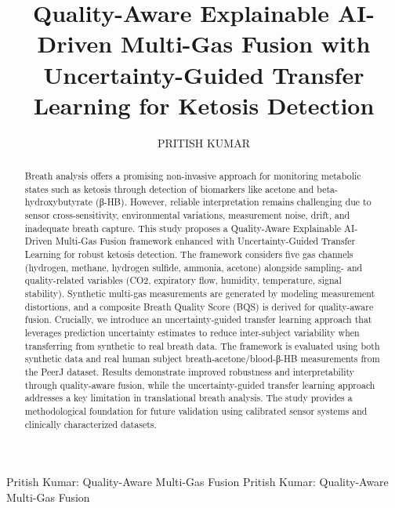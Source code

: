 \documentclass{ieeeaccess}
\begin{document}


\title{
Quality-Aware Explainable AI-Driven Multi-Gas Fusion with
Uncertainty-Guided Transfer Learning for Ketosis Detection
}

\author{
\uppercase{Pritish Kumar}
}

\address[1]{
Department of Electronics and Computer Engineering,
Thapar Institute of Engineering and Technology,
Patiala, Punjab, India
}

\markboth
{Pritish Kumar: Quality-Aware Multi-Gas Fusion}
{Pritish Kumar: Quality-Aware Multi-Gas Fusion}



\begin{abstract}

Breath analysis offers a promising non-invasive approach for monitoring metabolic states such as ketosis through detection of biomarkers like acetone and beta-hydroxybutyrate (β-HB). However, reliable interpretation remains challenging due to sensor cross-sensitivity, environmental variations, measurement noise, drift, and inadequate breath capture. This study proposes a Quality-Aware Explainable AI-Driven Multi-Gas Fusion framework enhanced with Uncertainty-Guided Transfer Learning for robust ketosis detection. The framework considers five gas channels (hydrogen, methane, hydrogen sulfide, ammonia, acetone) alongside sampling- and quality-related variables (CO2, expiratory flow, humidity, temperature, signal stability). Synthetic multi-gas measurements are generated by modeling measurement distortions, and a composite Breath Quality Score (BQS) is derived for quality-aware fusion. Crucially, we introduce an uncertainty-guided transfer learning approach that leverages prediction uncertainty estimates to reduce inter-subject variability when transferring from synthetic to real breath data. The framework is evaluated using both synthetic data and real human subject breath-acetone/blood-β-HB measurements from the PeerJ dataset. Results demonstrate improved robustness and interpretability through quality-aware fusion, while the uncertainty-guided transfer learning approach addresses a key limitation in translational breath analysis. The study provides a methodological foundation for future validation using calibrated sensor systems and clinically characterized datasets.

\end{abstract}
\end{document}
